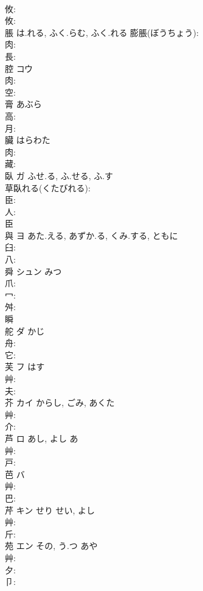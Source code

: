\documentclass[8pt]{extreport}
\begin{document}
\begin{CJK}{UTF8}{min}
\\	攸: 
\\	攸: 
\\	脹		は.れる, ふく.らむ, ふく.れる			膨脹(ぼうちょう): 
\\	肉: 
\\	長: 
\\	腔	コウ			
\\	肉: 
\\	空: 
\\	膏		あぶら				
\\	高: 
\\	月: 
\\	臟		はらわた				
\\	肉: 
\\	藏: 
\\	臥	ガ	ふせ.る, ふ.せる, ふ.す		
\\	草臥れる(くたびれる): 
\\	臣: 
\\	人: 
\\	臣 
\\	與	ヨ	あた.える, あずか.る, くみ.する, ともに		
\\	臼: 
\\	八: 
\\	舜	シュン		みつ	
\\	爪: 
\\	冖: 
\\	舛: 
\\	瞬 
\\	舵	ダ	かじ		
\\	舟: 
\\	它: 
\\	芙	フ		はす	
\\	艸: 
\\	夫: 
\\	芥	カイ	からし, ごみ, あくた		
\\	艸: 
\\	介: 
\\	芦	ロ	あし, よし	あ	
\\	艸: 
\\	戸: 
\\	芭	バ			
\\	艸: 
\\	巴: 
\\	芹	キン	せり	せい, よし	
\\	艸: 
\\	斤: 
\\	苑	エン	その, う.つ	あや	
\\	艸: 
\\	夕: 
\\	卩: 

\end{CJK}
\end{document}
